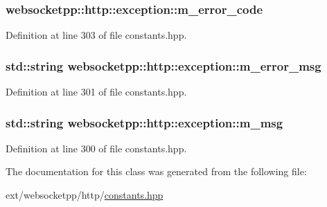\subsubsection[{m\+\_\+error\+\_\+code}]{ websocketpp\+::http\+::exception\+::m\+\_\+error\+\_\+code}\label{classwebsocketpp_1_1http_1_1exception_a169eaa70f405f073091194113fe75d0c}


Definition at line 303 of file constants.\+hpp.

\hypertarget{classwebsocketpp_1_1http_1_1exception_ab723cf4d6e80075e9a73da3b7577cdc3}{}
\subsubsection[{m\+\_\+error\+\_\+msg}]{\setlength{\rightskip}{0pt plus 5cm}std\+::string websocketpp\+::http\+::exception\+::m\+\_\+error\+\_\+msg}\label{classwebsocketpp_1_1http_1_1exception_ab723cf4d6e80075e9a73da3b7577cdc3}


Definition at line 301 of file constants.\+hpp.

\hypertarget{classwebsocketpp_1_1http_1_1exception_a2be9d8a05bad1b10432fdf4e25159dfe}{}
\subsubsection[{m\+\_\+msg}]{\setlength{\rightskip}{0pt plus 5cm}std\+::string websocketpp\+::http\+::exception\+::m\+\_\+msg}\label{classwebsocketpp_1_1http_1_1exception_a2be9d8a05bad1b10432fdf4e25159dfe}


Definition at line 300 of file constants.\+hpp.



The documentation for this class was generated from the following file\+:\begin{DoxyCompactItemize}
\item 
ext/websocketpp/http/\hyperlink{constants_8hpp}{constants.\+hpp}\end{DoxyCompactItemize}
